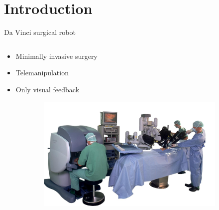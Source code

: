 \section{Introduction}


\begin{frame}{Da Vinci surgical robot}{}

\begin{columns}[T]
\begin{column}{1\textwidth}

  \begin{itemize}
    \item<1-> Minimally invasive surgery
    \vspace{0.3cm}
    \item<2-> Telemanipulation  
    \vspace{0.3cm}
    \item<3-> Only visual feedback  
  \end{itemize}
  
  \begin{figure}[H]
  	\centering
  	  \begin{subfigure}{0.6\textwidth}
  		\centering
  		\includegraphics[width=1\textwidth]{Billeder/Dan/davinci.jpg}
  	\end{subfigure}
  
  	
  	
  \end{figure}
\end{column}%

\end{columns}


\end{frame}




